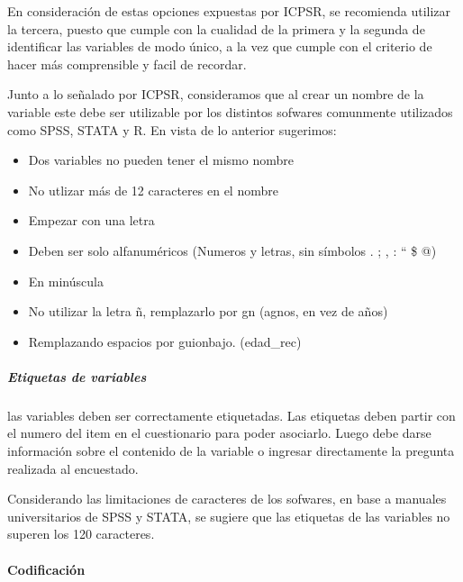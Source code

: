 \documentclass[
  14pt,
]{book}
\begin{document}
En consideración de estas opciones expuestas por ICPSR, se recomienda utilizar la tercera, puesto que cumple con la cualidad de la primera y la segunda de identificar las variables de modo único, a la vez que cumple con el criterio de hacer más comprensible y facil de recordar.

Junto a lo señalado por ICPSR, consideramos que al crear un nombre de la variable este debe ser utilizable por los distintos sofwares comunmente utilizados como SPSS, STATA y R. En vista de lo anterior sugerimos:

\begin{itemize}
\item
  Dos variables no pueden tener el mismo nombre
\item
  No utlizar más de 12 caracteres en el nombre
\item
  Empezar con una letra
\item
  Deben ser solo alfanuméricos (Numeros y letras, sin símbolos . ; , : `` \$ @)
\item
  En minúscula
\item
  No utilizar la letra ñ, remplazarlo por gn (agnos, en vez de años)
\item
  Remplazando espacios por guionbajo. (edad\_rec)
\end{itemize}

\hypertarget{etiquetas-de-variables}{%
\subparagraph{Etiquetas de variables}\label{etiquetas-de-variables}}

las variables deben ser correctamente etiquetadas. Las etiquetas deben partir con el numero del item en el cuestionario para poder asociarlo. Luego debe darse información sobre el contenido de la variable o ingresar directamente la pregunta realizada al encuestado.

Considerando las limitaciones de caracteres de los sofwares, en base a manuales universitarios de SPSS y STATA, se sugiere que las etiquetas de las variables no superen los 120 caracteres.

\hypertarget{codificaciuxf3n}{%
\paragraph{Codificación}\label{codificaciuxf3n}}
\end{document}
